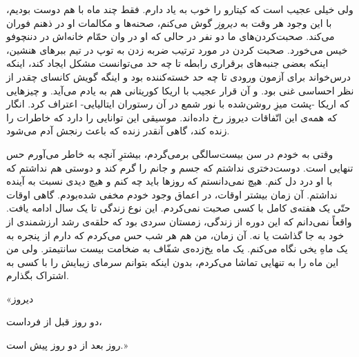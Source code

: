 \documentclass[a5paper]{book}
\begin{document}
 ولی خیلی عجیب است که کیتارو را خوب به یاد دارم. فقط چند ماه با هم دوست بودیم، با این وجود هر وقت به \emph{دیروز} گوش می‌کنم، صحنه‌ها و مکالمات او در ذهنم فوران می‌کند. صحبت‌کردن‌های ما دو نفر در حالی که او در وان حمّام خانه‌اش در دننچوفو خیس می‌خورد. صحبت کردن در مورد ترتیب ضربه زدن به توپ در تیم ببرهای هنشین، اینکه بعضی جنبه‌های برقراری رابطه تا چه حد می‌توانست مشکل ایجاد کند، اینکه درس‌خواند برای آزمون ورودی تا چه حد خسته‌کننده بود و اینگه گویش کانسای چقدر از نظر احساسی غنی بود. و آن قرار عجیب با اریکا کوریتانی هم به یادم می‌آید. و چیزهایی که اریکا -پشت میزِ روشن‌شده با نور شمع در آن رستوران ایتالیایی- اعتراف کرد. انگار که همه‌ی این اتّفاقات دیروز رخ داده‌اند. موسیقی این توانایی را دارد که خاطرات را زنده کند، گاهی آنقدر زنده که باعث رنجش آدم می‌شود.
 
 وقتی به خودم در سن بیست‌سالگی برمی‌گردم، بیشترِ آنچه به خاطر می‌آورم حس تنهایی است. دوست‌دختری نداشتم که جسم و جانم را گرم کند و دوستی هم نداشتم که با او درد دل کنم. هیچ نمی‌دانستم که روزها باید چه کنم و هیچ دیدی نسبت به آینده نداشتم. آن زمان بیشتر اوقات، در اعماق وجود خودم مخفی شده‌بودم. گاهی اوقات حتّی یک هفته‌ی کامل با کسی صحبت نمی‌کردم. این نوع زندگی تا یک سال ادامه یافت. واقعاً نمی‌دانم که این دوره از زندگی، زمستان سردی بود که حلقه‌ی رشد ارزشمندی از خود به جا گذاشت یا نه. آن زمان، من هم هر شب حس می‌کردم که دارم از پنجره به یک ماهِ یخی نگاه می‌کنم. یک ماه یخ‌زده‌ی شفّاف به ضخامت بیست سانتیمتر. ولی من این ماه را به تنهایی تماشا می‌کردم، بدون اینکه بتوانم سرمای زیبایش را با کسی به اشتراک بگذارم.
 
 «دیروز


دو روز قبل از فرداست،


روز بعد از دو روز پیش است.»
 
 
\end{document}
